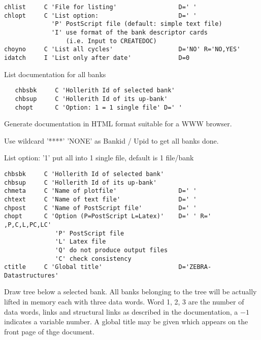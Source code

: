  
\begin{verbatim}
chlist     C 'File for listing'                 D=' '
chlopt     C 'List option:                      D=' '
             'P' PostScript file (default: simple text file)
             'I' use format of the bank descriptor cards
                 (i.e. Input to CREATEDOC)   
choyno     C 'List all cycles'                  D='NO' R='NO,YES'
idatch     I 'List only after date'             D=0
\end{verbatim}
 
List documentation for all banks
 
 
\begin{verbatim}
   chbsbk     C 'Hollerith Id of selected bank'
   chbsup     C 'Hollerith Id of its up-bank'
   chopt      C 'Option: 1 = 1 single file' D=' '
\end{verbatim}
 
Generate documentation in HTML format suitable for a WWW browser. 
 
Use wildcard '****' 'NONE' as Bankid / Upid to get all banks done.
 
List option:  '1' put all into 1 single file, default is 1 file/bank
 
 
 
\begin{verbatim}
chbsbk     C 'Hollerith Id of selected bank'
chbsup     C 'Hollerith Id of its up-bank'
chmeta     C 'Name of plotfile'                 D=' '
chtext     C 'Name of text file'                D=' '
chpost     C 'Name of PostScript file'          D=' '
chopt      C 'Option (P=PostScript L=Latex)'    D=' ' R=' ,P,C,L,PC,LC'
              'P' PostScript file
              'L' Latex file
              'Q' do not produce output files
              'C' check consistency
ctitle     C 'Global title'                     D='ZEBRA-Datastructures'
\end{verbatim}
 
Draw tree below a selected bank. 
All banks belonging to the tree will be
actually lifted in memory each with three data words. 
Word 1, 2, 3 are the number of data words, links and structural links
as described in the documentation, a $-1$ indicates a variable number.
A global title may be given which appears on the front page of
thge document.
 
